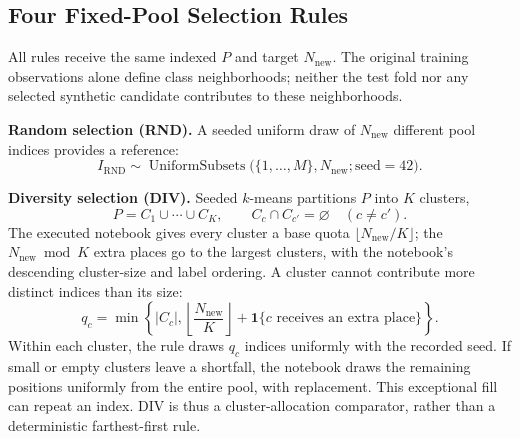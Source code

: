 \subsection{Four Fixed-Pool Selection Rules}

All rules receive the same indexed \(P\) and target \(N_{\mathrm{new}}\). The original training observations alone define class neighborhoods; neither the test fold nor any selected synthetic candidate contributes to these neighborhoods.

\textbf{Random selection (RND).} A seeded uniform draw of \(N_{\mathrm{new}}\) different pool indices provides a reference:
\begin{equation}\label{eq:4}
I_{\mathrm{RND}}\sim\operatorname{UniformSubsets}
\bigl(\{1,\ldots,M\},N_{\mathrm{new}};\mathrm{seed}=42\bigr).
\end{equation}

\textbf{Diversity selection (DIV).} Seeded \(k\)-means partitions \(P\) into \(K\) clusters,
\begin{equation}\label{eq:5}
P=C_1\cup\cdots\cup C_K,\qquad C_c\cap C_{c'}=\varnothing
\quad(c\ne c').
\end{equation}
The executed notebook gives every cluster a base quota \(\lfloor N_{\mathrm{new}}/K\rfloor\); the \(N_{\mathrm{new}}\bmod K\) extra places go to the largest clusters, with the notebook's descending cluster-size and label ordering. A cluster cannot contribute more distinct indices than its size:
\begin{equation}\label{eq:6}
q_c=\min\left\{|C_c|,\left\lfloor\frac{N_{\mathrm{new}}}{K}\right\rfloor+
\mathbf{1}\{c\text{ receives an extra place}\}\right\}.
\end{equation}
Within each cluster, the rule draws \(q_c\) indices uniformly with the recorded seed. If small or empty clusters leave a shortfall, the notebook draws the remaining positions uniformly from the entire pool, with replacement. This exceptional fill can repeat an index. DIV is thus a cluster-allocation comparator, rather than a deterministic farthest-first rule.

